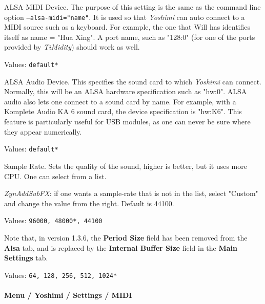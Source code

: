    \setcounter{ItemCounter}{0}      %

   ALSA MIDI Device.
   The purpose of this setting is the same as the command line option
   \texttt{--alsa-midi="name"}.
   It is used so that \textsl{Yoshimi} can auto connect to a MIDI source
   such as a keyboard.  For example, the one that Will has identifies itself
   as name = "Hua Xing".
   A port name, such as "128:0" (for one of the ports provided by
   \textsl{TiMidity}) should work as well.

   Values: \texttt{default*}

   ALSA Audio Device.
   This specifies the sound card to which \textsl{Yoshimi} can connect.
   Normally, this will be an ALSA hardware specification such as
   "hw:0".
   ALSA audio also lets one connect to a sound card by name. For example,
   with a Komplete Audio KA 6 sound card, the device specification is
   "hw:K6". This feature is particularly useful for USB modules, as one can
   never be sure where they appear numerically.

   Values: \texttt{default*}

   Sample Rate.
   Sets the quality of the sound, higher is better, but it uses more CPU.
   One can select from a list.
   
   \textsl{ZynAddSubFX}: if one wants a sample-rate that
   is not in the list, select "Custom" and change the value from the right.
   Default is 44100.

   Values: \texttt{96000, 48000*, 44100}

   Note that, in version 1.3.6, the \textbf{Period Size} field has been
   removed from the \textbf{Alsa} tab, and is replaced by the 
   \textbf{Internal Buffer Size} field in the \textbf{Main Settings} tab.


   Values: \texttt{64, 128, 256, 512, 1024*}

\paragraph{Menu / Yoshimi / Settings / MIDI}
\label{paragraph:menu_yoshimi_settings_ccs}

